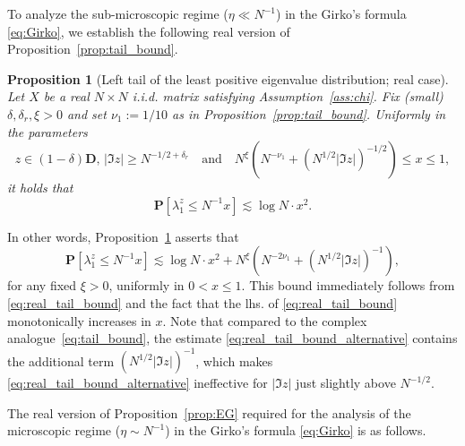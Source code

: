 \documentclass[10pt]{amsart}
\newtheorem{proposition}[theorem]{Proposition}
\numberwithin{equation}{section}
\begin{document}
To analyze the sub-microscopic regime ($\eta\ll N^{-1}$) in the Girko's formula \eqref{eq:Girko}, we establish the following real version of Proposition~\ref{prop:tail_bound}.

\begin{proposition}[Left tail of the least positive eigenvalue distribution; real case]\label{prop:real_tail_bound} Let $X$ be a real $N\times N$ i.i.d. matrix satisfying Assumption~\ref{ass:chi}. Fix (small) $\delta, \delta_r, \xi>0$ and set $\nu_1:=1/10$ as in Proposition~\ref{prop:tail_bound}. Uniformly in the parameters
\begin{equation*}
z\in (1-\delta)\mathbf{D}, \,|\Im z|\ge N^{-1/2+\delta_r}\quad \text{and}\quad N^\xi\left(N^{-\nu_1} + \left(N^{1/2}|\Im z|\right)^{-1/2}\right)\le x\le 1,
\end{equation*}
it holds that
\begin{equation}
\mathbf{P}[\lambda_1^z\le N^{-1}x]\lesssim \log N \cdot x^2.
\label{eq:real_tail_bound}
\end{equation}
\end{proposition}

In other words, Proposition~\ref{prop:real_tail_bound} asserts that
\begin{equation}
\mathbf{P}[\lambda_1^z\le N^{-1}x]\lesssim \log N \cdot x^2 + N^\xi\left(N^{-2\nu_1} + \left(N^{1/2}|\Im z|\right)^{-1}\right),
\label{eq:real_tail_bound_alternative}
\end{equation}
for any fixed $\xi>0$, uniformly in $0<x\le 1$. This bound immediately follows from \eqref{eq:real_tail_bound} and the fact that the lhs. of \eqref{eq:real_tail_bound} monotonically increases in $x$. Note that compared to the complex analogue~\eqref{eq:tail_bound}, the estimate \eqref{eq:real_tail_bound_alternative} contains the additional term $\left(N^{1/2}|\Im z|\right)^{-1}$, which makes \eqref{eq:real_tail_bound_alternative} ineffective for $|\Im z|$ just slightly above $N^{-1/2}$.


The real version of Proposition~\ref{prop:EG} required for the analysis of the microscopic regime ($\eta\sim N^{-1}$) in the Girko's formula \eqref{eq:Girko} is as follows.
\end{document}
